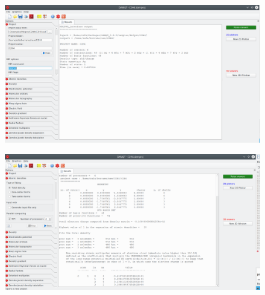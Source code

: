 \documentclass[a4paper,10pt]{article}
\begin{document}
\begin{minipage}{.5\linewidth}
\begin{figure}[H]
\caption{\label{fig:3}}
\begin{center}
\includegraphics[width=0.95\linewidth]{damqt_QS_fig3.png}
\end{center}
\end{figure} 
\end{minipage}
\begin{minipage}{.5\linewidth}
\begin{figure}[H]
\caption{\label{fig:4}}
\begin{center}
\includegraphics[width=0.95\linewidth]{damqt_QS_fig4.png}
\end{center}
\end{figure} 
\end{minipage}
\end{document}
